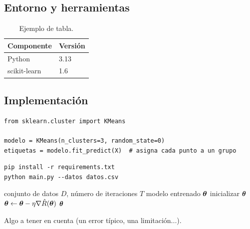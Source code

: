\documentclass{upo-master}
\begin{document}
\subsection{Entorno y herramientas}

\begin{table}[htbp]
  \centering
  \caption{Ejemplo de tabla.}
  \label{tab:entorno}
  \begin{tabular}{ll}
    \toprule
    \textbf{Componente} & \textbf{Versión} \\
    \midrule
    Python & 3.13 \\
    scikit-learn & 1.6 \\
    \bottomrule
  \end{tabular}
\end{table}

\subsection{Implementación}

\begin{lstlisting}[style=python, caption={Ejemplo de código Python.}, label={lst:ejemplo}]
from sklearn.cluster import KMeans

modelo = KMeans(n_clusters=3, random_state=0)
etiquetas = modelo.fit_predict(X)  # asigna cada punto a un grupo
\end{lstlisting}

\begin{lstlisting}[style=bash]
pip install -r requirements.txt
python main.py --datos datos.csv
\end{lstlisting}

\begin{algorithm}[htbp]
\caption{Ejemplo de pseudocódigo}\label{alg:ejemplo}
\begin{algorithmic}[1]
\Require conjunto de datos $D$, número de iteraciones $T$
\Ensure modelo entrenado $\boldsymbol{\theta}$
\State inicializar $\boldsymbol{\theta}$
  \State $\boldsymbol{\theta} \gets \boldsymbol{\theta} - \eta \nabla \hat{R}(\boldsymbol{\theta})$
\EndFor
\State \Return $\boldsymbol{\theta}$
\end{algorithmic}
\end{algorithm}

\begin{aviso}
Algo a tener en cuenta (un error típico, una limitación...).
\end{aviso}

\end{document}
